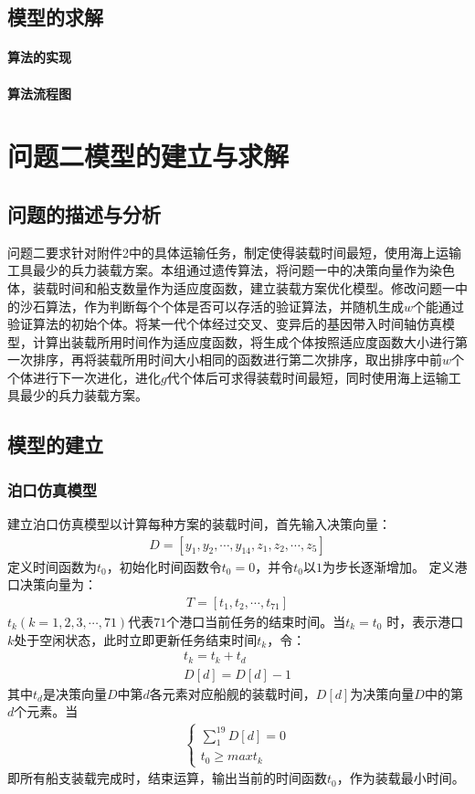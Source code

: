 \documentclass{whutmod}
\begin{document}
  \subsection{模型的求解}
  	\paragraph{算法的实现}
	\paragraph{算法流程图}
		
		
	\section{问题二模型的建立与求解}
	\subsection{问题的描述与分析}
	问题二要求针对附件2中的具体运输任务，制定使得装载时间最短，使用海上运输工具最少的兵力装载方案。本组通过遗传算法，将问题一中的决策向量作为染色体，装载时间和船支数量作为适应度函数，建立装载方案优化模型。修改问题一中的沙石算法，作为判断每个个体是否可以存活的验证算法，并随机生成$w$个能通过验证算法的初始个体。将某一代个体经过交叉、变异后的基因带入时间轴仿真模型，计算出装载所用时间作为适应度函数，将生成个体按照适应度函数大小进行第一次排序，再将装载所用时间大小相同的函数进行第二次排序，取出排序中前$w$个个体进行下一次进化，进化$g$代个体后可求得装载时间最短，同时使用海上运输工具最少的兵力装载方案。
	\subsection{模型的建立}
	\subsubsection{泊口仿真模型}
	建立泊口仿真模型以计算每种方案的装载时间，首先输入决策向量：
		\begin{gather*}
	 D=[y_{1},y_{2},\cdots,y_{14},z_{1},z_{2},\cdots,z_{5}]
		\end{gather*}
	定义时间函数为$t_{0}$，初始化时间函数令$t_{0}=0$，并令$t_{0}$以$1$为步长逐渐增加。
	定义港口决策向量为：
		\begin{gather*}
		T=[t_{1},t_{2},\cdots,t_{71}]
		\end{gather*}
	$t_{k}(k=1,2,3,\cdots,71)$代表$71$个港口当前任务的结束时间。当$t_{k}=t_{0}$ 时，表示港口$k$处于空闲状态，此时立即更新任务结束时间$t_{k}$，令：
		\begin{gather*}
		t_{k}=t_{k}+t_{d}\\
		D[d]=D[d]-1
		\end{gather*}
	其中$t_{d}$是决策向量$D$中第$d$各元素对应船舰的装载时间，$D[d]$为决策向量$D$中的第$d$个元素。当
		\begin{gather*}
	\left\{\begin{matrix} \sum_{1}^{19}D[d]=0
	\\t_{0}\geqslant max t_{k} 	
	\end{matrix}\right.
		\end{gather*}
		即所有船支装载完成时，结束运算，输出当前的时间函数$t_{0}$，作为装载最小时间。
\end{document}
